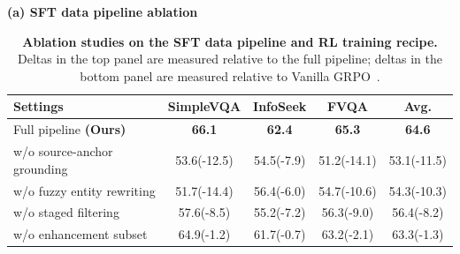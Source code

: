 \providecommand{\dup}[1]{\textcolor{red!75!black}{(+#1)}}
\providecommand{\ddn}[1]{\textcolor{green!55!black}{(-#1)}}

\begin{table}[H]
    \setlength{\abovecaptionskip}{2pt}
    \setlength{\belowcaptionskip}{3pt}
    \caption{\textbf{Ablation studies on the SFT data pipeline and RL training recipe.} Deltas in the top panel are measured relative to the full pipeline; deltas in the bottom panel are measured relative to Vanilla GRPO~\citep{jin2025searchr1trainingllmsreason}.}
    \label{tab:data-pipeline-ablation}
    \label{tab:training-recipe-ablation}
    \centering
    \scriptsize
    \setlength{\tabcolsep}{4.5pt}
    \renewcommand{\arraystretch}{0.92}
    \textbf{(a) SFT data pipeline ablation}\\[-0.2em]
    \begin{tabularx}{0.85\linewidth}{l CCCC}
    \toprule
    \textbf{Settings} & SimpleVQA & InfoSeek & FVQA & \textbf{Avg.} \\
    \midrule
    Full pipeline \textbf{(Ours)}      & \textbf{66.1}            & \textbf{62.4}            & \textbf{65.3}             & \textbf{64.6} \\
    \quad w/o source-anchor grounding  & 53.6\ddn{12.5}           & 54.5\ddn{7.9}            & 51.2\ddn{14.1}            & 53.1\ddn{11.5} \\
    \quad w/o fuzzy entity rewriting   & 51.7\ddn{14.4}           & 56.4\ddn{6.0}            & 54.7\ddn{10.6}            & 54.3\ddn{10.3} \\
    \quad w/o staged filtering         & 57.6\ddn{8.5}            & 55.2\ddn{7.2}            & 56.3\ddn{9.0}             & 56.4\ddn{8.2}  \\
    \quad w/o enhancement subset       & 64.9\ddn{1.2}            & 61.7\ddn{0.7}            & 63.2\ddn{2.1}             & 63.3\ddn{1.3}  \\
    \bottomrule
    \end{tabularx}


\end{table}
